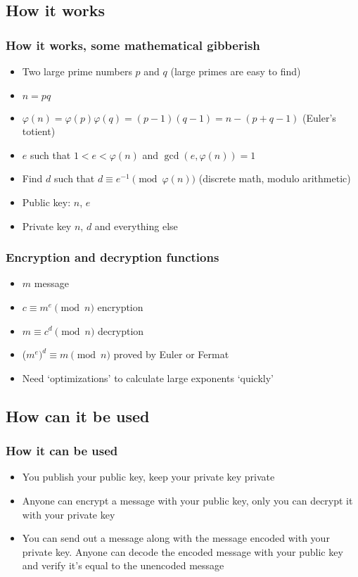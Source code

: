 \documentclass{beamer}
\begin{document}
\subsection{How it works}

\begin{frame}
	\frametitle{How it works, some mathematical gibberish}
	\begin{itemize}
		\item Two large prime numbers $p$ and $q$ (large primes are
                      easy to find)
		\item $n = pq$
		\item $\varphi(n) = \varphi(p)\varphi(q) = (p-1)(q-1) = n - (p + q -1)$
		      (Euler's totient)
		\item $e$ such that $1 < e < \varphi(n)$ and $\gcd(e, \varphi(n)) = 1$
		\item Find $d$ such that $d \equiv e^{-1} \pmod{\varphi(n)}$
		      (discrete math, modulo arithmetic)
	\end{itemize}

	\begin{itemize}
		\item Public key: $n$, $e$
		\item Private key $n$, $d$ and everything else
	\end{itemize}
\end{frame}

\begin{frame}
	\frametitle{Encryption and decryption functions}
	\begin{itemize}
		\item $m$ message
		\item $c \equiv m^e \pmod{n}$ encryption
		\item $m \equiv c^d \pmod{n}$ decryption
		\item ($m^e)^d \equiv m \pmod{n}$ proved by Euler or Fermat
		\item Need `optimizations' to calculate large exponents
		      `quickly'
	\end{itemize}
\end{frame}

\subsection{How can it be used}

\begin{frame}
	\frametitle{How it can be used}

	\begin{itemize}
		\item You publish your public key, keep your private key
		      private

		\item Anyone can encrypt a message with your public key,
		      only you can decrypt it with your private key

		\item You can send out a message along with the message
		      encoded with your private key. Anyone can decode the
		      encoded message with your public key and verify
		      it's equal to the unencoded message
	\end{itemize}
\end{frame}
\end{document}
